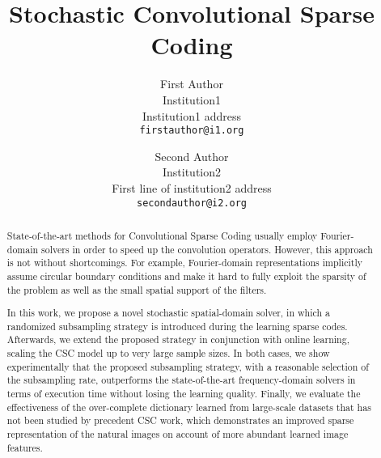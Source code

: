 \documentclass[10pt,twocolumn,letterpaper]{article}
\begin{document}
\title{Stochastic Convolutional Sparse Coding}

\author{First Author\\
Institution1\\
Institution1 address\\
{\tt\small firstauthor@i1.org}
\and
Second Author\\
Institution2\\
First line of institution2 address\\
{\tt\small secondauthor@i2.org}
}

\maketitle

\begin{abstract}
  State-of-the-art methods for Convolutional Sparse Coding usually
  employ Fourier-domain solvers in order to speed up the convolution
  operators. However, this approach is not without shortcomings. For
  example, Fourier-domain representations implicitly assume circular
  boundary conditions and make it hard to fully exploit the sparsity
  of the problem as well as the small spatial support of the filters.
  

  In this work, we propose a novel stochastic spatial-domain solver,
  in which a randomized subsampling strategy is introduced during the
  learning sparse codes. Afterwards, we extend the proposed strategy
  in conjunction with online learning, scaling the CSC model up to
  very large sample sizes. In both cases, we show experimentally that
  the proposed subsampling strategy, with a reasonable selection of
  the subsampling rate, outperforms the state-of-the-art
  frequency-domain solvers in terms of execution time without losing
  the learning quality. Finally, we evaluate the effectiveness of the
  over-complete dictionary learned from large-scale datasets that has
  not been studied by precedent CSC work, which demonstrates an
  improved sparse representation of the natural images on account of
  more abundant learned image features.
\end{abstract}











{\small


}

\clearpage
\appendix


\end{document}
